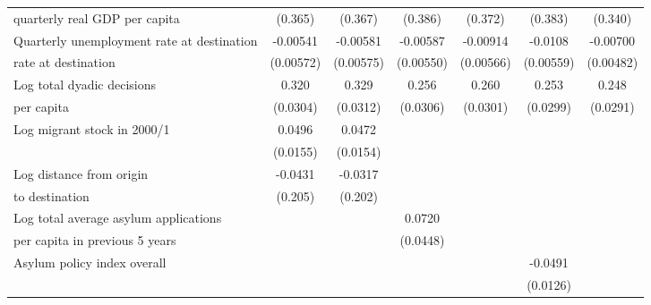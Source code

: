 \begin{table}[htbp]
\begin{tabular}{l*{6}{c}}
 quarterly real GDP per capita                    &     (0.365)         &     (0.367)         &     (0.386)         &     (0.372)         &     (0.383)         &     (0.340)         \\
[0,5em]
Quarterly unemployment rate at destination&    -0.00541         &    -0.00581         &    -0.00587         &    -0.00914         &     -0.0108         &    -0.00700         \\
 rate at destination                    &   (0.00572)         &   (0.00575)         &   (0.00550)         &   (0.00566)         &   (0.00559)         &   (0.00482)         \\
[0,5em]
Log total dyadic decisions&       0.320\sym{***}&       0.329\sym{***}&       0.256\sym{***}&       0.260\sym{***}&       0.253\sym{***}&       0.248\sym{***}\\
per capita                    &    (0.0304)         &    (0.0312)         &    (0.0306)         &    (0.0301)         &    (0.0299)         &    (0.0291)         \\
[0,5em]
Log migrant stock in 2000/1&      0.0496\sym{**} &      0.0472\sym{**} &                     &                     &                     &                     \\
                    &    (0.0155)         &    (0.0154)         &                     &                     &                     &                     \\
[0,5em]
Log distance from origin&     -0.0431         &     -0.0317         &                     &                     &                     &                     \\
 to destination                    &     (0.205)         &     (0.202)         &                     &                     &                     &                     \\
[0,5em]
Log total average asylum applications&                     &                     &      0.0720         &                     &                     &                     \\
 per capita in previous 5 years                    &                     &                     &    (0.0448)         &                     &                     &                     \\
[0,5em]
Asylum policy index overall&                     &                     &                     &                     &     -0.0491\sym{***}&                     \\
                    &                     &                     &                     &                     &    (0.0126)         &                     \\

\end{tabular}
\end{table}
